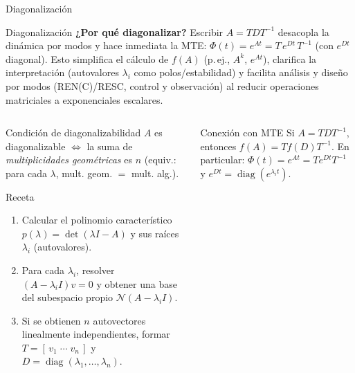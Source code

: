 \documentclass[
    10pt,
    aspectratio=169,
    xcolor={dvipsnames},
    spanish,
    ]{beamer}
\begin{document}
\begin{frame}{Diagonalización}
\footnotesize
\begin{block}{Diagonalización}
  \noindent\textbf{¿Por qué diagonalizar?}
Escribir $A=TDT^{-1}$ desacopla la dinámica por modos y hace inmediata la MTE:
$\Phi(t)=e^{At}=T\,e^{Dt}\,T^{-1}$ (con $e^{Dt}$ diagonal). Esto simplifica el cálculo de $f(A)$ (p.\,ej., $A^k$, $e^{At}$), clarifica la interpretación (autovalores $\lambda_i$ como polos/estabilidad) y facilita análisis y diseño por modos (REN(C)/RESC, control y observación) al reducir operaciones
matriciales a exponenciales escalares.

\end{block}
\begin{columns}
  \begin{column}{0.52\textwidth}

    \begin{block}{Condición de diagonalizabilidad}
      $A$ es diagonalizable $\Longleftrightarrow$ la suma de \emph{multiplicidades geométricas} es $n$ (equiv.: para cada $\lambda$, mult. geom. $=$ mult. alg.).
    \end{block}
    \begin{block}{Receta}
    \begin{enumerate}\itemsep2pt
      \item Calcular el polinomio característico $p(\lambda)=\det(\lambda I-A)$ y sus raíces $\lambda_i$ (autovalores).
      \item Para cada $\lambda_i$, resolver $(A-\lambda_i I)v=0$ y obtener una base del subespacio propio $\mathcal N(A-\lambda_i I)$.
      \item Si se obtienen $n$ autovectores linealmente independientes, formar $T=[\,v_1\;\cdots\;v_n\,]$ y $D=\operatorname{diag}(\lambda_1,\dots,\lambda_n)$.
    \end{enumerate}
    \end{block}

  \end{column}

  \begin{column}{0.46\textwidth}
  

    \begin{block}{Conexión con MTE}
    Si $A=TDT^{-1}$, entonces $f(A)=Tf(D)T^{-1}$. En particular: $\Phi(t)=e^{At}=Te^{Dt}T^{-1}$ y $e^{Dt}=\operatorname{diag}(e^{\lambda_i t})$.
    \end{block}
  \end{column}
\end{columns}
\end{frame}
\end{document}
